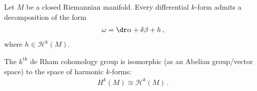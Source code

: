 
    \begin{theorem}
        Let $M$ be a closed Riemannian manifold. Every differential $k$-form admits a decomposition of the form
        \begin{gather}
            \omega = \dr\alpha+\delta\beta+h\,,
        \end{gather}
        where $h\in\mathcal{H}^k(M)$.
    \end{theorem}
    \begin{result}
        The $k^{\text{th}}$ de Rham cohomology group is isomorphic (as an Abelian group/vector space) to the space of harmonic $k$-forms:
        \begin{gather}
            H^k(M)\cong\mathcal{H}^k(M)\,.
        \end{gather}
    \end{result}

